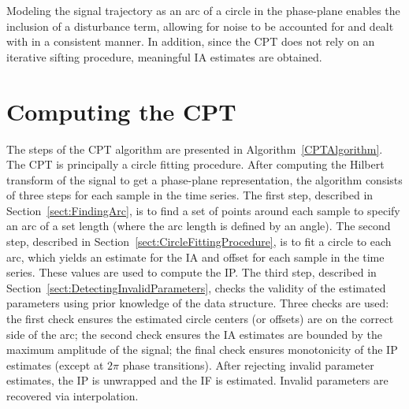 \documentclass[a4paper]{IEEEtran}
\newcommand{\todo}[1]{\textsf{\emph{\textbf{\textcolor{blue}{#1}}}}}
\begin{document}
Modeling the signal trajectory as an arc of a circle in the phase-plane enables the inclusion of a disturbance term, allowing for noise to be accounted for and dealt with in a consistent manner. In addition, since the CPT does not rely on an iterative sifting procedure, meaningful IA estimates are obtained.



\section{Computing the CPT}\label{sect:ComputingCPTSection}
The steps of the CPT algorithm are presented in Algorithm~\ref{CPTAlgorithm}. The CPT is principally a circle fitting procedure. After computing the Hilbert transform of the signal to get a phase-plane representation, the algorithm consists of three steps for each sample in the time series. 
The first step, described in Section~\ref{sect:FindingArc}, is to find a set of points around each sample to specify an arc of a set length (where the arc length is defined by an angle). The second step, described in Section~\ref{sect:CircleFittingProcedure}, is to fit a circle to each arc, which yields an estimate for the IA and offset for each sample in the time series. These values are used to compute the IP. The third step, described in Section~\ref{sect:DetectingInvalidParameters}, checks the validity of the estimated parameters using prior knowledge of the data structure. Three checks are used: the first check ensures the estimated circle centers (or offsets) are on the correct side of the arc; the second check ensures the IA estimates are bounded by the maximum amplitude of the signal; the final check ensures monotonicity of the IP estimates (except at $2\pi$ phase transitions). After rejecting invalid parameter estimates, the IP is unwrapped and the IF is estimated. Invalid parameters are recovered via interpolation. 
\end{document}

